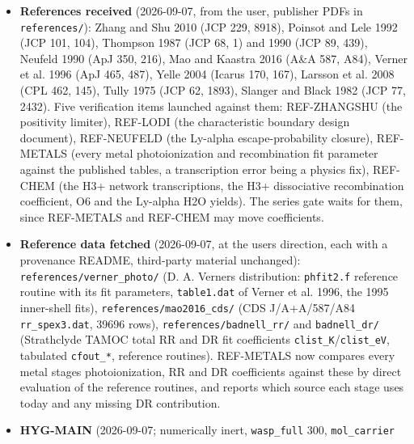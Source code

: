 \documentclass[english,a4paper]{my_memo}
\begin{document}
\begin{itemize}
  Case label and comments now say "third-order WENO"; identifiers unchanged.
  Advisor: \texttt{paper/ms.tex} 144 "the energy-stable ESWENO3" reworded to the
  verified attribution and the ESWENO3 name replaced by WENO3 there and in
  \texttt{docs/code\_comparison.tex}. \textbf{Recorded for the user:} every \texttt{src/tests/*/}
  suite of this series (19 directories) and the 2026-09-05/06 design and
  plan documents are untracked in git; a fresh clone of the remote carries
  none of them.
\item
  \textbf{References received} (2026-09-07, from the user, publisher PDFs in
  \texttt{references/}): Zhang and Shu 2010 (JCP 229, 8918), Poinsot and Lele 1992
  (JCP 101, 104), Thompson 1987 (JCP 68, 1) and 1990 (JCP 89, 439), Neufeld
  1990 (ApJ 350, 216), Mao and Kaastra 2016 (A\&A 587, A84), Verner et al.
  1996 (ApJ 465, 487), Yelle 2004 (Icarus 170, 167), Larsson et al. 2008 (CPL
  462, 145), Tully 1975 (JCP 62, 1893), Slanger and Black 1982 (JCP 77,
  2432). Five verification items launched against them: REF-ZHANGSHU (the
  positivity limiter), REF-LODI (the characteristic boundary design
  document), REF-NEUFELD (the Ly-alpha escape-probability closure),
  REF-METALS (every metal photoionization and recombination fit parameter
  against the published tables, a transcription error being a physics fix),
  REF-CHEM (the H3+ network transcriptions, the H3+ dissociative
  recombination coefficient, O6 and the Ly-alpha H2O yields). The series
  gate waits for them, since REF-METALS and REF-CHEM may move coefficients.
\item
  \textbf{Reference data fetched} (2026-09-07, at the user\textquotesingle s direction, each with
  a provenance README, third-party material unchanged): \texttt{references/verner\_photo/}
  (D. A. Verner\textquotesingle s distribution: \texttt{phfit2.f} reference routine with its fit
  parameters, \texttt{table1.dat} of Verner et al. 1996, the 1995 inner-shell fits),
  \texttt{references/mao2016\_cds/} (CDS J/A+A/587/A84 \texttt{rr\_spex3.dat}, 39696 rows),
  \texttt{references/badnell\_rr/} and \texttt{badnell\_dr/} (Strathclyde TAMOC total RR and
  DR fit coefficients \texttt{clist\_K}/\texttt{clist\_eV}, tabulated \texttt{cfout\_*}, reference
  routines). REF-METALS now compares every metal stage\textquotesingle s photoionization, RR
  and DR coefficients against these by direct evaluation of the reference
  routines, and reports which source each stage uses today and any missing
  DR contribution.
\item
  \textbf{HYG-MAIN} (2026-09-07; numerically inert, \texttt{wasp\_full} 300, \texttt{mol\_carrier}

\end{itemize}
\end{document}
